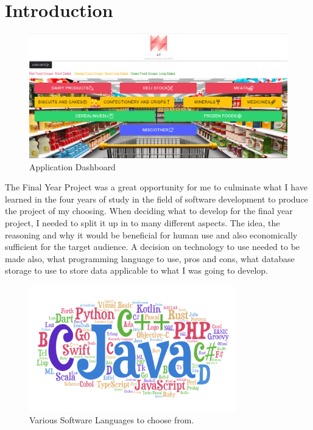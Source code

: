 \chapter{Introduction}

\begin{figure}[h!]
	\caption{Application Dashboard}
	\label{image:dashboard1}
	\centering
	\includegraphics[width=1\textwidth]{images/dashboard.PNG}
\end{figure}

The Final Year Project was a great opportunity for me to culminate what I have learned in the four years of study in the field of software development to produce the project of my choosing. When deciding what to develop for the final year project, I needed to split it up in to many different aspects. The idea, the reasoning and why it would be beneficial for human use and also economically sufficient for the target audience. A decision on technology to use needed to be made also, what programming language to use, pros and cons, what database storage to use to store data applicable to what I was going to develop.  

\begin{figure}[h!]
	\caption{Various Software Languages to choose from.}
	\label{image:progLanguages}
	\centering
	\includegraphics[width=0.8\textwidth]{images/progLanguages.png}
\end{figure}	

